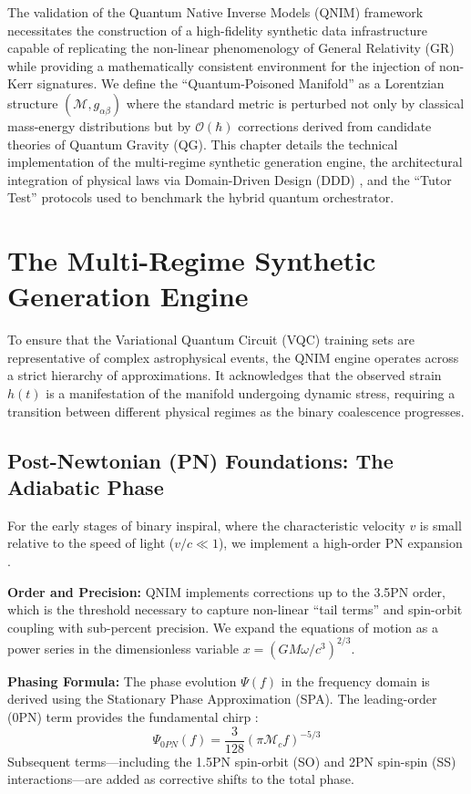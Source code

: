 \documentclass[11pt,a4paper,spanish]{book}
\numberwithin{equation}{chapter}
\numberwithin{figure}{chapter}
\numberwithin{equation}{chapter}
\numberwithin{figure}{chapter}
\numberwithin{table}{chapter}
\begin{document}
The validation of the Quantum Native Inverse Models (QNIM) framework necessitates the construction of a high-fidelity synthetic data infrastructure capable of replicating the non-linear phenomenology of General Relativity (GR) while providing a mathematically consistent environment for the injection of non-Kerr signatures. We define the ``Quantum-Poisoned Manifold'' as a Lorentzian structure $(\mathcal{M}, g_{\alpha\beta})$ \cite{arxiv10032373} where the standard metric is perturbed not only by classical mass-energy distributions but by $\mathcal{O}(\hbar)$ corrections derived from candidate theories of Quantum Gravity (QG). This chapter details the technical implementation of the multi-regime synthetic generation engine, the architectural integration of physical laws via Domain-Driven Design (DDD) \cite{geeksforgeeks_ddd}, and the ``Tutor Test'' protocols used to benchmark the hybrid quantum orchestrator.

\section{The Multi-Regime Synthetic Generation Engine}

To ensure that the Variational Quantum Circuit (VQC) training sets are representative of complex astrophysical events, the QNIM engine operates across a strict hierarchy of approximations. It acknowledges that the observed strain $h(t)$ is a manifestation of the manifold undergoing dynamic stress, requiring a transition between different physical regimes as the binary coalescence progresses.

\subsection{Post-Newtonian (PN) Foundations: The Adiabatic Phase}

For the early stages of binary inspiral, where the characteristic velocity $v$ is small relative to the speed of light ($v/c \ll 1$), we implement a high-order PN expansion \cite{pmc_post_newtonian, post_newtonian_wiki}.

\textbf{Order and Precision:} QNIM implements corrections up to the 3.5PN order, which is the threshold necessary to capture non-linear ``tail terms'' and spin-orbit coupling with sub-percent precision. We expand the equations of motion as a power series in the dimensionless variable $x=(GM\omega/c^3)^{2/3}$.

\textbf{Phasing Formula:} The phase evolution $\Psi(f)$ in the frequency domain is derived using the Stationary Phase Approximation (SPA). The leading-order (0PN) term provides the fundamental chirp \cite{pure_mpg_phasing}:
\begin{equation}
    \Psi_{0PN}(f) = \frac{3}{128} (\pi \mathcal{M}_c f)^{-5/3}
\end{equation}
Subsequent terms—including the 1.5PN spin-orbit (SO) and 2PN spin-spin (SS) interactions—are added as corrective shifts to the total phase. 
\end{document}

